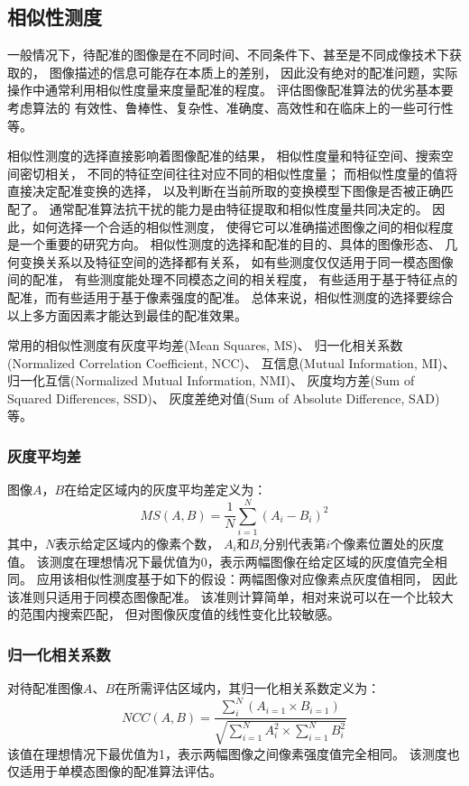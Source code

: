\subsection{相似性测度}\label{SectionMetric}
一般情况下，待配准的图像是在不同时间、不同条件下、甚至是不同成像技术下获取的，
图像描述的信息可能存在本质上的差别，
因此没有绝对的配准问题，实际操作中通常利用相似性度量来度量配准的程度。
评估图像配准算法的优劣基本要考虑算法的
有效性、鲁棒性、复杂性、准确度、高效性和在临床上的一些可行性等。

相似性测度的选择直接影响着图像配准的结果，
相似性度量和特征空间、搜索空间密切相关，
不同的特征空间往往对应不同的相似性度量；
而相似性度量的值将直接决定配准变换的选择，
以及判断在当前所取的变换模型下图像是否被正确匹配了。
通常配准算法抗干扰的能力是由特征提取和相似性度量共同决定的。
因此，如何选择一个合适的相似性测度，
使得它可以准确描述图像之间的相似程度是一个重要的研究方向。
相似性测度的选择和配准的目的、具体的图像形态、
几何变换关系以及特征空间的选择都有关系，
如有些测度仅仅适用于同一模态图像间的配准，
有些测度能处理不同模态之间的相关程度，
有些适用于基于特征点的配准，而有些适用于基于像素强度的配准。
总体来说，相似性测度的选择要综合以上多方面因素才能达到最佳的配准效果。

常用的相似性测度有灰度平均差(Mean Squares, MS)、
归一化相关系数(Normalized Correlation Coefficient, NCC)、
互信息(Mutual Information, MI)、
归一化互信(Normalized Mutual Information, NMI)、
灰度均方差(Sum of Squared Differences, SSD)、
灰度差绝对值(Sum of Absolute Difference, SAD)等。

\subsubsection{灰度平均差}
图像$A$，$B$在给定区域内的灰度平均差定义为：
\begin{equation}
  MS(A,B)=\frac{1}{N}\sum^{N}_{i=1}(A_i-B_i)^2
\end{equation}
其中，$N$表示给定区域内的像素个数，
$A_i$和$B_i$分别代表第$i$个像素位置处的灰度值。
该测度在理想情况下最优值为0，表示两幅图像在给定区域的灰度值完全相同。
应用该相似性测度基于如下的假设：两幅图像对应像素点灰度值相同，
因此该准则只适用于同模态图像配准。
该准则计算简单，相对来说可以在一个比较大的范围内搜索匹配，
但对图像灰度值的线性变化比较敏感。

\subsubsection{归一化相关系数}
对待配准图像$A$、$B$在所需评估区域内，其归一化相关系数定义为：
\begin{equation}
  NCC(A,B)=\frac{\sum_i^N(A_{i=1}\times B_{i=1})}%
  {\sqrt{\sum_{i=1}^NA^2_i\times \sum_{i=1}^NB_i^2}}
\end{equation}
该值在理想情况下最优值为1，表示两幅图像之间像素强度值完全相同。
该测度也仅适用于单模态图像的配准算法评估。

